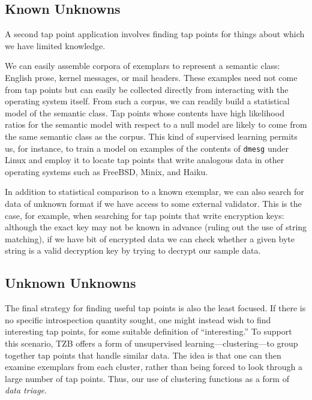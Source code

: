 \subsection{Known Unknowns}
\label{sec:technical:subsec:knownunk}

A second tap point application involves finding tap points for things
about which we have limited knowledge.

We can easily assemble corpora of exemplars to represent a semantic
class: English prose, kernel messages, or mail headers. These examples
need not come from tap points but can easily be collected directly from
interacting with the operating system itself. From such a corpus, we can
readily build a statistical model of the semantic class. Tap points
whose contents have high likelihood ratios for the semantic model with
respect to a null model are likely to come from the same semantic class
as the corpus. This kind of supervised learning permits us, for
instance, to train a model on examples of the contents of \texttt{dmesg}
under Linux and employ it to locate tap points that write analogous data
in other operating systems such as FreeBSD, Minix, and Haiku.

In addition to statistical comparison to a known exemplar, we can also
search for data of unknown format if we have access to some external
validator. This is the case, for example, when searching for tap points
that write encryption keys: although the exact key may not be known in
advance (ruling out the use of string matching), if we have bit of
encrypted data we can check whether a given byte string is a valid
decryption key by trying to decrypt our sample data.

\subsection{Unknown Unknowns}

The final strategy for finding useful tap points is also the least
focused. If there is no specific introspection quantity sought, one
might instead wish to find interesting tap points, for some suitable
definition of ``interesting.'' To support this scenario, TZB offers a
form of unsupervised learning---clustering---to group together tap
points that handle similar data. The idea is that one can then examine
exemplars from each cluster, rather than being forced to look through a
large number of tap points. Thus, our use of clustering functions as a
form of \emph{data triage}.
